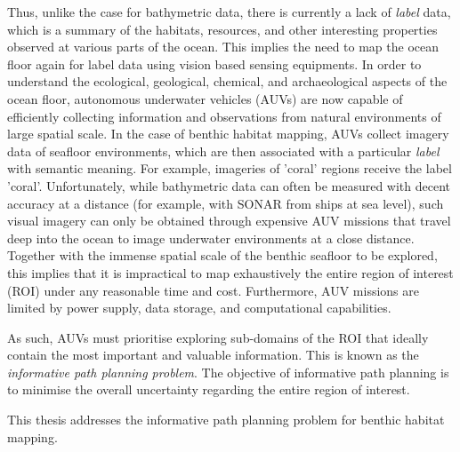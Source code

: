 		Thus, unlike the case for bathymetric data, there is currently a lack of \textit{label} data, which is a summary of the habitats, resources, and other interesting properties observed at various parts of the ocean. This implies the need to map the ocean floor again for label data using vision based sensing equipments. In order to understand the ecological, geological, chemical, and archaeological aspects of the ocean floor, autonomous underwater vehicles (AUVs) are now capable of efficiently collecting information and observations from natural environments of large spatial scale. In the case of benthic habitat mapping, AUVs collect imagery data of seafloor environments, which are then associated with a particular \textit{label} with semantic meaning. For example, imageries of 'coral' regions receive the label 'coral'. Unfortunately, while bathymetric data can often be measured with decent accuracy at a distance (for example, with SONAR from ships at sea level), such visual imagery can only be obtained through expensive AUV missions that travel deep into the ocean to image underwater environments at a close distance. Together with the immense spatial scale of the benthic seafloor to be explored, this implies that it is impractical to map exhaustively the entire region of interest (ROI) under any reasonable time and cost. Furthermore, AUV missions are limited by power supply, data storage, and computational capabilities. 
		
		As such, AUVs must prioritise exploring sub-domains of the ROI that ideally contain the most important and valuable information. This is known as the \textit{informative path planning problem}. The objective of informative path planning is to minimise the overall uncertainty regarding the entire region of interest.
		
		This thesis addresses the informative path planning problem for benthic habitat mapping. %
		
